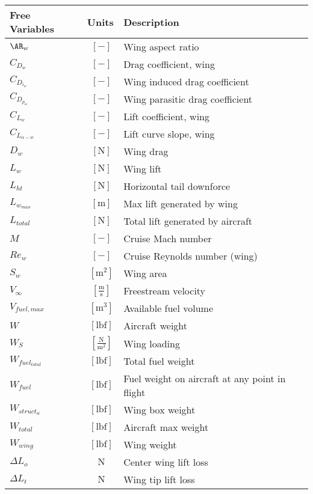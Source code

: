 % 

{\footnotesize
\begin{supertabular}{lcl}
\toprule
Free Variables & Units & Description \\ \midrule
$\AR_w$ & $~[-]$ & Wing aspect ratio \\
$C_{D_w}$ & $~[-]$ & Drag coefficient, wing \\
$C_{D_{i_w}}$ & $~[-]$ & Wing induced drag coefficient \\
$C_{D_{p_w}}$ & $~[-]$ & Wing parasitic drag coefficient \\
$C_{L_w}$ & $~[-]$ & Lift coefficient, wing \\
$C_{L_{\alpha-w}}$ & $~[-]$ & Lift curve slope, wing \\
$D_{w}$ & $~\mathrm{[N]}$ & Wing drag \\
$L_w$ & $~\mathrm{[N]}$ & Wing lift \\
$L_{ht}$ & $~\mathrm{[N]}$ & Horizontal tail downforce \\
$L_{w_{max}}$ & $~\mathrm{[m]}$ & Max lift generated by wing\\
$L_{total}$ & $~\mathrm{[N]}$ & Total lift generated by aircraft\\ 
$M$ & $~[-]$ & Cruise Mach number \\
$Re_w$ & $~[-]$ & Cruise Reynolds number (wing) \\
$S_w$ & $~\mathrm{[m^{2}]}$ & Wing area \\
$V_{\infty}$ & $~\mathrm{[\tfrac{m}{s}]}$ & Freestream velocity \\
$V_{fuel, max}$ & $~\mathrm{[m^{3}]}$ & Available fuel volume \\
$W$ & $~\mathrm{[lbf]}$ & Aircraft weight \\
$W_{S}$ & $~\mathrm{[\frac{N}{m^2}]}$ & Wing loading \\
$W_{fuel_{total}}$ & $~\mathrm{[lbf]}$ & Total fuel weight \\
$W_{fuel}$ & $~\mathrm{[lbf]}$ & Fuel weight on aircraft at any point in flight\\
$W_{struct_{w}}$ & $~\mathrm{[lbf]}$ & Wing box weight \\
$W_{total}$ & $~\mathrm{[lbf]}$ & Aircraft max weight \\
$W_{wing}$ & $~\mathrm{[lbf]}$ & Wing weight \\
$\Delta L_{o}$ & $~\mathrm{N}$ & Center wing lift loss \\
$\Delta L_{t}$ & $~\mathrm{N}$ & Wing tip lift loss \\

\end{supertabular}}

